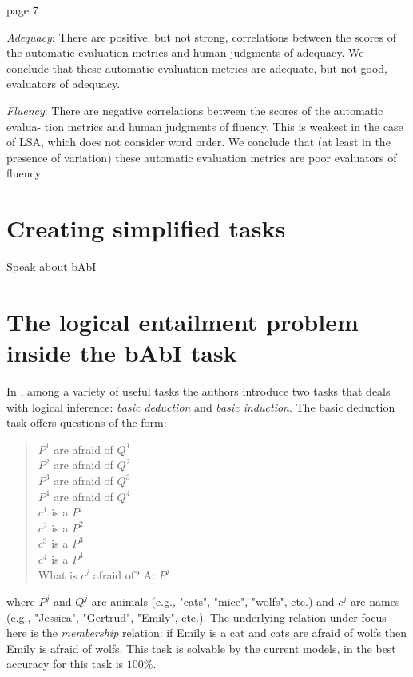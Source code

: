  \cite{Stent}  page 7

\textit{Adequacy}: There  are  positive,  but  not  strong,  correlations  between  the  scores  of
the automatic evaluation metrics and human judgments of adequacy. We conclude that
these automatic evaluation metrics are adequate, but not good, evaluators of adequacy.

\textit{Fluency}: There are negative correlations between the scores of the automatic evalua-
tion metrics and human judgments of fluency. This is weakest in the case of LSA, which
does not consider word order. We conclude that (at least in the presence of variation)
these automatic evaluation metrics are poor evaluators of fluency



\section{Creating simplified tasks}
\label{ch:03-tasks}

Speak about bAbI


\section{The logical entailment problem inside the bAbI task}
\label{ch:03-tasks}


In \cite{WestonBCM15}, among a variety of useful tasks the authors introduce two tasks that deals with logical inference: \textit{basic deduction} and \textit{basic induction}. The basic deduction task offers questions of the form:

\begin{quote} 
\centering 
$P^{1}$ are afraid of $Q^{1}$\\
$P^{2}$ are afraid of $Q^{2}$\\
$P^{3}$ are afraid of $Q^{3}$\\
$P^{4}$ are afraid of $Q^{4}$\\
$c^{1}$ is a $P^{1}$\\
$c^{2}$ is a $P^{2}$\\
$c^{3}$ is a $P^{3}$\\
$c^{4}$ is a $P^{4}$\\
What is $c^j$ afraid of? A: $P^{j}$\\
\end{quote}

where $P^j$ and $Q^j$ are animals (e.g., "cats", "mice", "wolfs", etc.) and $c^j$ are names (e.g., "Jessica", "Gertrud", "Emily", etc.). The underlying relation under focus here is the \textit{membership} relation: if Emily is a cat and cats are afraid of wolfs then Emily is afraid of wolfs. This task is solvable by the current models, in \cite{WestonBCM15} the best accuracy for this task is $100\%$. 

